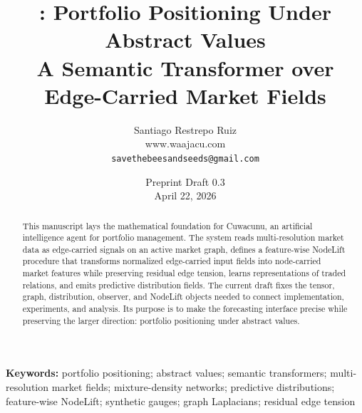 \documentclass[10pt,letterpaper]{article}
\title{\Cuwacunu{}: Portfolio Positioning Under Abstract Values\\
\large A Semantic Transformer over Edge-Carried Market Fields}
\author{\normalsize Santiago Restrepo Ruiz\\
\small www.waajacu.com\\
\small \texttt{savethebeesandseeds@gmail.com}}
\date{Preprint Draft 0.3\\April 22, 2026}
\newcommand{\Cuwacunu}{Cuwacunu}
\newcommand{\keywords}[1]{%
  \vspace{0.35em}
  \noindent\textbf{Keywords:} #1}
\begin{document}
\maketitle

\begin{abstract}
This manuscript lays the mathematical foundation for \Cuwacunu{}, an artificial
intelligence agent for portfolio management.  The system reads multi-resolution
market data as edge-carried signals on an active market graph, defines a
feature-wise NodeLift procedure that transforms normalized edge-carried input
fields into node-carried market features while preserving residual edge tension,
learns representations of traded relations, and emits predictive distribution
fields.  The
current draft fixes the tensor, graph, distribution, observer, and NodeLift
objects needed to connect implementation, experiments, and analysis.  Its
purpose is to make the forecasting interface precise while preserving the larger
direction: portfolio positioning under abstract values.
\end{abstract}

\keywords{portfolio positioning; abstract values; semantic transformers;
multi-resolution market fields; mixture-density networks; predictive
distributions; feature-wise NodeLift; synthetic gauges; graph Laplacians;
residual edge tension}

\tableofcontents










\appendix





\end{document}
